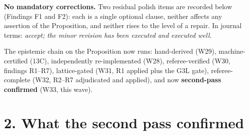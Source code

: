 \documentclass[11pt,a4paper]{article}
\begin{document}
\textbf{No mandatory corrections.} Two residual polish items are recorded
below (Findings F1 and F2): each is a single optional clause, neither
affects any assertion of the Proposition, and neither rises to the level of
a repair. In journal terms: \emph{accept; the minor revision has been
executed and executed well.}

The epistemic chain on the Proposition now runs: hand-derived (W29),
machine-certified (13C), independently re-implemented (W28),
referee-verified (W30, findings R1--R7), lattice-gated (W31, R1 applied
plus the G3L gate), referee-complete (W32, R2--R7 adjudicated and applied),
and now \textbf{second-pass confirmed} (W33, this wave).

\section*{2. What the second pass confirmed}
\end{document}
